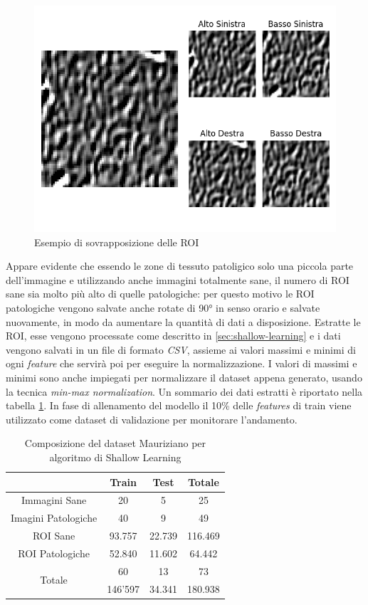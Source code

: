 \begin{figure}
    \includegraphics[width=\textwidth]{./assets/path-overlap.png}
    \caption{\label{fig:patch-overlap}Esempio di sovrapposizione delle ROI}
\end{figure}

Appare evidente che essendo le zone di tessuto patoligico solo
una piccola parte dell'immagine e utilizzando anche immagini
totalmente sane, il numero di ROI sane sia molto più alto di
quelle patologiche: per questo motivo le ROI patologiche
vengono salvate anche rotate di 90° in senso orario e salvate
nuovamente, in modo da aumentare la quantità di dati
a disposizione.
Estratte le ROI, esse vengono processate come descritto in
\ref{sec:shallow-learning} e i dati vengono salvati
in un file di formato {\it CSV}, assieme ai valori massimi
e minimi di ogni {\it feature} che servirà poi per eseguire
la normalizzazione.
I valori di massimi e minimi sono anche impiegati per
normalizzare il dataset appena generato, usando la tecnica
{\it min-max normalization}.
Un sommario dei dati estratti è riportato nella tabella
\ref{tab:mauriziano}.
In fase di allenamento del modello il 10\% delle
{\it features} di train viene utilizzato come
dataset di validazione per monitorare l'andamento.

\begin{table}
    \center
    \begin{tabular}[h]{||c||c|c|c||}
        \hline
        & Train & Test & Totale \\
        \hline
        Immagini Sane & 20 & 5 & 25 \\
        \hline
        Imagini Patologiche & 40 & 9 & 49 \\
        \hline
        ROI Sane & 93.757 & 22.739 & 116.469 \\
        \hline
        ROI Patologiche & 52.840 & 11.602 & 64.442 \\
        \hline
        \hline
        \multirow{2}{*}{Totale} & 60 & 13 & 73 \\ \cline{2-4}
        & 146'597 & 34.341 & 180.938 \\
        \hline
    \end{tabular}
    \caption{\label{tab:mauriziano}Composizione del dataset Mauriziano per
    algoritmo di Shallow Learning}
\end{table}

